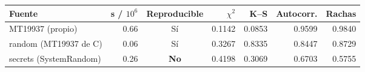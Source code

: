 \begin{tabular}{lrcrrrr}
\toprule
Fuente & s / $10^6$ & Reproducible & $\chi^2$ & K--S & Autocorr. & Rachas \\
\midrule
MT19937 (propio) & 0.66 & Sí & 0.1142 & 0.0853 & 0.9599 & 0.9840 \\
random (MT19937 de C) & 0.06 & Sí & 0.3267 & 0.8335 & 0.8447 & 0.8729 \\
secrets (SystemRandom) & 0.26 & \textbf{No} & 0.4198 & 0.3069 & 0.6703 & 0.5755 \\
\bottomrule
\end{tabular}
